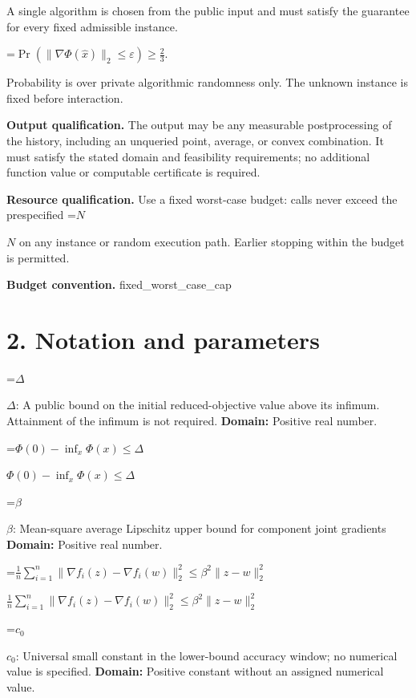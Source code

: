 \documentclass[10pt,a4paper]{article}
\newcommand{\AtlasMath}[1]{\par\begingroup\centering\setbox0=\hbox{$\displaystyle #1$}\ifdim\wd0>1.4\linewidth\typeout{ATLAS WIDE FORMULA: \the\wd0}\fi\ifdim\wd0>\linewidth\resizebox{\linewidth}{!}{\box0}\else\box0\fi\par\endgroup}
\newcommand{\AtlasInlineMath}[1]{\begingroup\setbox0=\hbox{$#1$}\ifdim\wd0>.4\linewidth\endgroup\AtlasMath{#1}\else\endgroup$#1$\fi}
\begin{document}
A single algorithm is chosen from the public input and must satisfy the guarantee for every fixed admissible instance.




\AtlasMath{\Pr\!\left(\|\nabla\Phi(\widehat{x})\|_2\le\varepsilon\right)\ge\frac23.}




Probability is over private algorithmic randomness only. The unknown instance is fixed before interaction.



\textbf{Output qualification.} The output may be any measurable postprocessing of the history, including an unqueried point, average, or convex combination. It must satisfy the stated domain and feasibility requirements; no additional function value or computable certificate is required.



\textbf{Resource qualification.} Use a fixed worst-case budget: calls never exceed the prespecified \AtlasInlineMath{N} on any instance or random execution path. Earlier stopping within the budget is permitted.



\textbf{Budget convention.} fixed\_worst\_case\_cap



\section{2. Notation and parameters}


\AtlasInlineMath{\Delta}: A public bound on the initial reduced-objective value above its infimum. Attainment of the infimum is not required. \textbf{Domain:} Positive real number.



\AtlasInlineMath{\Phi(0)-\inf_x\Phi(x)\le\Delta}



\AtlasInlineMath{\beta}: Mean-square average Lipschitz upper bound for component joint gradients \textbf{Domain:} Positive real number.



\AtlasInlineMath{\frac1n\sum_{i=1}^n\|\nabla f_i(z)-\nabla f_i(w)\|_2^2\le\beta^2\|z-w\|_2^2}



\AtlasInlineMath{c_0}: Universal small constant in the lower-bound accuracy window; no numerical value is specified. \textbf{Domain:} Positive constant without an assigned numerical value.
\end{document}
